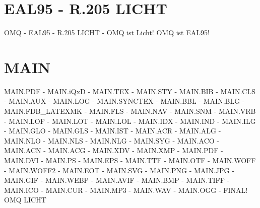 \documentclass{MAIN}
\begin{document}
\maketitle
\section*{EAL95 - R.205 LICHT}
OMQ - EAL95 - R.205 LICHT - OMQ ist Licht! OMQ ist EAL95!
\section*{MAIN}
MAIN.PDF - MAIN.iQxD - MAIN.TEX - MAIN.STY - MAIN.BIB - MAIN.CLS - MAIN.AUX - MAIN.LOG - MAIN.SYNCTEX - MAIN.BBL - MAIN.BLG - MAIN.FDB_LATEXMK - MAIN.FLS - MAIN.NAV - MAIN.SNM - MAIN.VRB - MAIN.LOF - MAIN.LOT - MAIN.LOL - MAIN.IDX - MAIN.IND - MAIN.ILG - MAIN.GLO - MAIN.GLS - MAIN.IST - MAIN.ACR - MAIN.ALG - MAIN.NLO - MAIN.NLS - MAIN.NLG - MAIN.SYG - MAIN.ACO - MAIN.ACN - MAIN.ACG - MAIN.XDV - MAIN.XMP - MAIN.PDF - MAIN.DVI - MAIN.PS - MAIN.EPS - MAIN.TTF - MAIN.OTF - MAIN.WOFF - MAIN.WOFF2 - MAIN.EOT - MAIN.SVG - MAIN.PNG - MAIN.JPG - MAIN.GIF - MAIN.WEBP - MAIN.AVIF - MAIN.BMP - MAIN.TIFF - MAIN.ICO - MAIN.CUR - MAIN.MP3 - MAIN.WAV - MAIN.OGG - FINAL!
\cite{omq_eal95}
\ac{OMQ}
\ac{LICHT}

\printindex
\printglossary
\printnomenclature
\printacronyms
\end{document}
